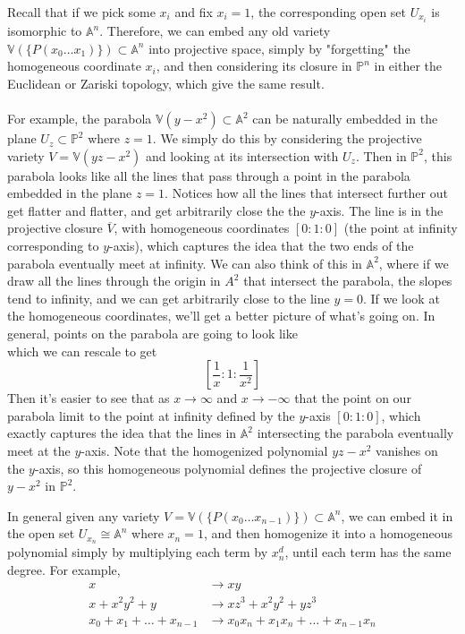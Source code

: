 \documentclass[psamsfonts]{amsart}
\theoremstyle{definition}
\theoremstyle{remark}
\newcommand{\A}{\mathbb{A}}
\newcommand{\p}{\mathbb{P}}
\newcommand{\V}{\mathbb{V}}
\begin{document}
Recall that if we pick some $x_i$ and fix $x_i = 1$, the corresponding open set $U_{x_i}$ is isomorphic to $\A^n$. Therefore, we can embed any old variety $\V(\{P(x_0 \dots x_1)\}) \subset \A^n$ into projective space, simply by "forgetting" the homogeneous coordinate $x_i$, and then considering its closure in $\p^n$ in either the Euclidean or Zariski topology, which give the same result.\\\\
For example, the parabola $\V(y-x^2) \subset \A^2$ can be naturally embedded in the plane $U_z \subset \p^2$ where $z  = 1$. We simply do this by considering the projective variety $V = \V(yz-x^2)$ and looking at its intersection with $U_z$. Then in $\p^2$, this parabola looks like all the lines that pass through a point in the parabola embedded in the plane $z = 1$. Notices how all the lines that intersect further out get flatter and flatter, and get arbitrarily close the the $y$-axis. The line is in the projective closure $\overline{V}$, with homogeneous coordinates $[0:1:0]$ (the point at infinity corresponding to $y$-axis), which captures the idea that the two ends of the parabola eventually meet at infinity. We can also think of this in $\A^2$, where if we draw all the lines through the origin in $A^2$ that intersect the parabola, the slopes tend to infinity, and we can get arbitrarily close to the line $y = 0$. If we look at the homogeneous coordinates, we'll get a better picture of what's going on. In general, points on the parabola are going to look like \begin{equation*}
[x:x^2:1]
\end{equation*}
which we can rescale to get
\begin{equation*}
\left[ \frac{1}{x}:1:\frac{1}{x^2} \right]
\end{equation*}
Then it's easier to see that as $x \to \infty$ and $x \to -\infty$ that the point on our parabola limit to the point at infinity defined by the $y$-axis $[0:1:0]$, which exactly captures the idea that the lines in $\A^2$ intersecting the parabola eventually meet at the $y$-axis. Note that the homogenized polynomial $yz - x^2$ vanishes on the $y$-axis, so this homogeneous polynomial defines the projective closure of $y-x^2$ in $\p^2$.

In general given any variety $V = \V(\{P(x_0 \dots x_{n-1})\}) \subset \A^n$, we can embed it in the open set $U_{x_n}\cong \A^n$ where $x_n = 1$, and then homogenize it into a homogeneous polynomial simply by multiplying each term by $x_n^d$, until each term has the same degree. For example, 
\begin{align*}
x &\to xy \\
x +x^2y^2 +y &\to xz^3 + x^2y^2 + yz^3 \\
x_0 + x_1 + \dots + x_{n-1} &\to x_0x_n + x_1x_n + \dots + x_{n-1}x_n 
\end{align*}
\end{document}
